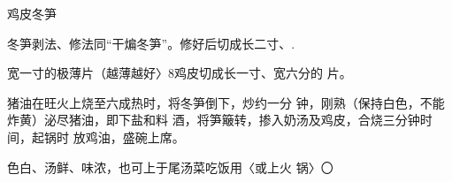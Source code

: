 \begin{recipe}{鸡皮冬笋}

\ingredients


\cooking

\step 冬笋剥法、修法同“干煸冬笋”。修好后切成长二寸、.

宽一寸的极薄片（越薄越好〉8鸡皮切成长一寸、宽六分的 片。

\step 猪油在旺火上烧至六成热时，将冬笋倒下，炒约一分 钟，刚熟（保持白色，不能炸黄）泌尽猪油，即下盐和料 酒，将笋簸转，掺入奶汤及鸡皮，合烧三分钟时间，起锅时 放鸡油，盛碗上席。

\notes

色白、汤鲜、味浓，也可上于尾汤菜吃饭用〈或上火 锅〉〇

\end{recipe}

